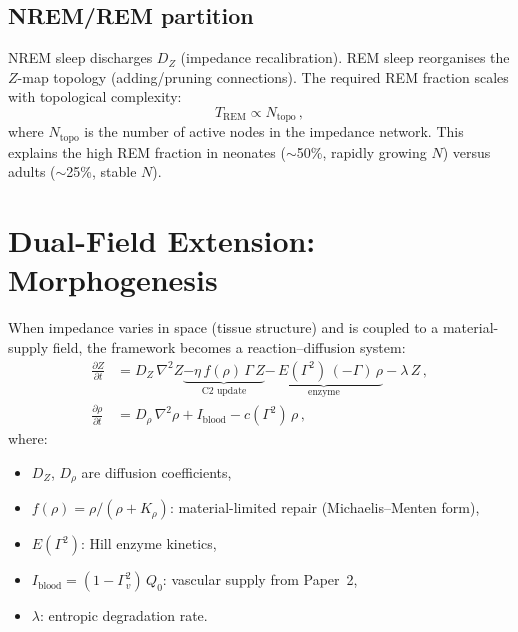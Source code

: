 \documentclass[aps,pre,twocolumn,superscriptaddress,floatfix]{revtex4-2}
\begin{document}
\subsection{NREM/REM partition}
\label{sec:NREM-REM}

NREM sleep discharges $D_Z$ (impedance recalibration).
REM sleep reorganises the $Z$-map topology
(adding/pruning connections).
The required REM fraction scales with topological complexity:
\begin{equation}
  T_{\mathrm{REM}} \propto N_{\mathrm{topo}}\,,
  \label{eq:REM-fraction}
\end{equation}
where $N_{\mathrm{topo}}$ is the number of active nodes
in the impedance network.
This explains the high REM fraction in neonates
($\sim$50\%, rapidly growing $N$) versus adults
($\sim$25\%, stable $N$).


\section{Dual-Field Extension: Morphogenesis}
\label{sec:dual-field}

When impedance varies in space (tissue structure)
and is coupled to a material-supply field,
the framework becomes a reaction--diffusion system:
\begin{align}
  \frac{\partial Z}{\partial t}
    &= D_Z\,\nabla^2 Z
    \underbrace{-\eta\,f(\rho)\,\Gamma\,Z}_{\text{C2 update}}
    \underbrace{-\,E(\Gamma^2)\,(-\Gamma)\,\rho}_{\text{enzyme}}
    - \lambda\,Z\,,
  \label{eq:Z-field} \\[4pt]
  \frac{\partial\rho}{\partial t}
    &= D_\rho\,\nabla^2\rho
    + I_{\mathrm{blood}}
    - c(\Gamma^2)\,\rho\,,
  \label{eq:rho-field}
\end{align}
where:
\begin{itemize}
  \item $D_Z$, $D_\rho$ are diffusion coefficients,
  \item $f(\rho) = \rho/(\rho + K_\rho)$: material-limited
    repair (Michaelis--Menten form),
  \item $E(\Gamma^2)$: Hill enzyme kinetics,
  \item $I_{\mathrm{blood}} = (1-\Gamma_v^2)\,Q_0$: vascular
    supply from Paper~2,
  \item $\lambda$: entropic degradation rate.
\end{itemize}
\end{document}
